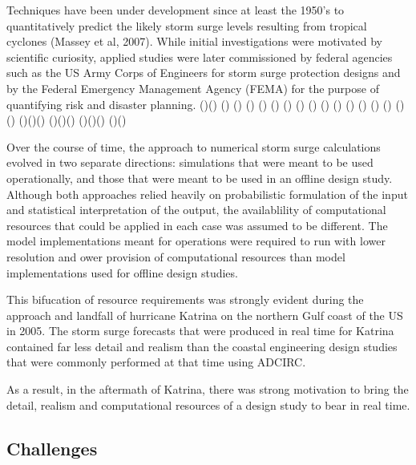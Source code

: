 \documentclass[12pt]{article}
\begin{document}
Techniques have been under development since at least the 1950’s to 
quantitatively predict the likely storm surge levels resulting from 
tropical cyclones (Massey et al, 2007). While initial investigations 
were motivated by scientific curiosity, applied studies were later 
commissioned by federal agencies such as the US Army Corps of 
Engineers for storm surge protection designs and by the Federal 
Emergency Management Agency (FEMA) for the purpose of quantifying 
risk and disaster planning. (\cite{LynchDR2004})(\cite
{ASGSOperatorsGuide2011}) (\cite{ASGSDevelopersGuide2011}) (\cite
{BlainCA1998}) (\cite{BlainCA2002}) (\cite{BlainCA2002}) (\cite
{DietrichJC2012}) (\cite{FlatherRA1994}) (\cite{GraberHC2006}) (\cite
{HollandGJ1980}) (\cite{HoustonSH1999}) (\cite{HubbertGD1991}) (\cite
{LynchDR2004}) (\cite{MasseyWG2007}) (\cite{OConnorWP1999}) (\cite
{VerlaanM2005}) (\cite{XieL2006}) (\cite{MattocksC2006}) (\cite
{RamakrishnanL2006})(\cite{KennedyA2010})(\cite{FlemingJG2008})
(\cite{JelesnianskiCP1992})(\cite{GlahnB2009})(\cite{GlahnB2009})
(\cite{KimSC1996})(\cite{BlainCA2002Tidal})(\cite{BlantonBO2012})
(\cite{VanCootenS2011})(\cite{BooijN1999})

Over the course of time, the approach to numerical storm surge 
calculations evolved in two separate directions: simulations that 
were meant to be used operationally, and those that were meant to be 
used in an offline design study. Although both approaches relied 
heavily on probabilistic formulation of the input and statistical 
interpretation of the output, the availablility of computational 
resources that could be applied in each case was assumed to be 
different. The model implementations meant for operations were 
required to run with lower resolution and ower provision of 
computational resources than model implementations used for offline 
design studies. 

This bifucation of resource requirements was strongly evident during 
the approach and landfall of hurricane Katrina on the northern Gulf 
coast of the US in 2005. The storm surge forecasts that were 
produced in real time for Katrina contained far less detail and 
realism than the coastal engineering design studies that were 
commonly performed at that time using ADCIRC. 

As a result, in the aftermath of Katrina, there was strong 
motivation to bring the detail, realism and computational resources 
of a design study to bear in real time.  

\subsection{Challenges}
\end{document}
